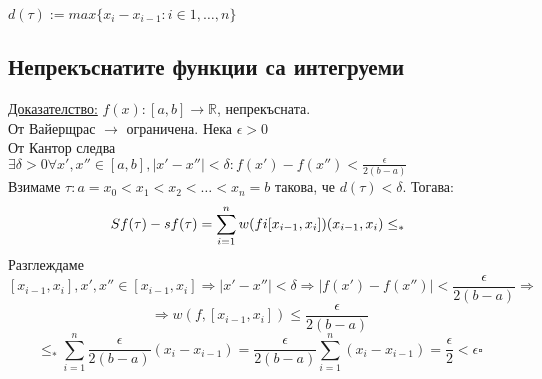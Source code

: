 \documentclass{article}
\newcommand{\tvurdenie}[2]{
    \begin{tcolorbox}[title = #1 ,colframe = blue!70!black, colback = blue!10!white]
        #2
    \end{tcolorbox}
}
\newcommand{\opredelenie}[2]{
    \begin{tcolorbox}[title = #1 ,colframe = red!70!black, colback = red!10!white]
        #2
    \end{tcolorbox}
}
\begin{document}

\opredelenie{Диаметър на $\tau$}{
    $d(\tau):= max\{x_i-x_{i-1} : i \in {1,\dots,n}\}$
}

\subsection*{Непрекъснатите функции са интегруеми}
\underline{Доказателство:} $f(x): [a,b] \to \mathbb{R}$, непрекъсната. \\
От Вайерщрас $\to$ ограничена. Нека $\epsilon > 0 $ \\
От Кантор следва $\exists \delta >0 \forall x',x'' \in [a,b], |x'-x''|<\delta : f(x')-f(x'') < \frac{\epsilon}{2(b-a)}$ \\
Взимаме $\tau: a=x_0<x_1<x_2<\dots<x_n=b$ такова, че $d(\tau)<\delta$. Тогава: \\
\[Sf(\tau)-sf(\tau)=\sum_{i=1}^{n}w(fi[x_{i-1}, x_i])(x_{i-1}, x_i) \le_{*} \\ \]
Разглеждаме
\[[x_{i-1}, x_i], x', x'' \in [x_{i-1}, x_i] \Rightarrow |x'-x''|<\delta\Rightarrow|f(x')-f(x'')|< \frac{\epsilon}{2(b-a)} \Rightarrow\]
\[\Rightarrow w(f, [x_{i-1}, x_i]) \le \frac{\epsilon}{2(b-a)}\]
\[\le_{*} \sum_{i=1}^{n}\frac{\epsilon}{2(b-a)}(x_i-x_{i-1}) = \frac{\epsilon}{2(b-a)}\sum_{i=1}^{n}(x_i-x_{i-1}) = \frac{\epsilon}{2} < \epsilon \square\]
\end{document}
